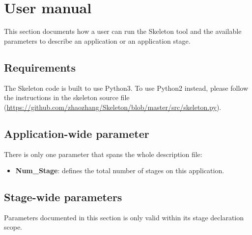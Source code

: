 \documentclass[10pt,a4paper]{article}
\begin{document}
\section{User manual}

This section documents how a user can run the Skeleton tool and the available parameters to describe an application or an application stage.

\subsection{Requirements}

The Skeleton code is built to use Python3.  To use Python2 instead, please follow the instructions in the skeleton source file (\url{https://github.com/zhaozhang/Skeleton/blob/master/src/skeleton.py}). 

\subsection{Application-wide parameter}

There is only one parameter that spans the whole description file:

\begin{itemize}

\item{\textbf{Num\_Stage}:} defines the total number of stages on this application.

\end{itemize}

\subsection{Stage-wide parameters}\label{sec:stage-wide}

Parameters documented in this section is only valid within its stage declaration scope.
\end{document}
